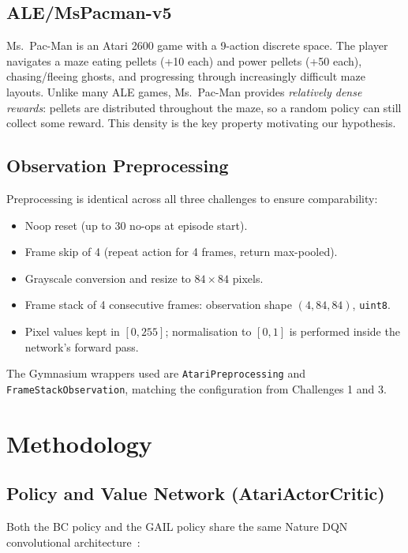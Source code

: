 \documentclass[conference]{IEEEtran}
\begin{document}
\subsection{ALE/MsPacman-v5}

Ms.\ Pac-Man is an Atari 2600 game with a 9-action discrete space.
The player navigates a maze eating pellets (+10 each) and power pellets (+50 each),
chasing/fleeing ghosts, and progressing through increasingly difficult maze layouts.
Unlike many ALE games, Ms.\ Pac-Man provides \emph{relatively dense rewards}: pellets
are distributed throughout the maze, so a random policy can still collect some reward.
This density is the key property motivating our hypothesis.

\subsection{Observation Preprocessing}

Preprocessing is identical across all three challenges to ensure comparability:
\begin{itemize}
  \item Noop reset (up to 30 no-ops at episode start).
  \item Frame skip of 4 (repeat action for 4 frames, return max-pooled).
  \item Grayscale conversion and resize to $84 \times 84$ pixels.
  \item Frame stack of 4 consecutive frames: observation shape $(4, 84, 84)$, \texttt{uint8}.
  \item Pixel values kept in $[0, 255]$; normalisation to $[0,1]$ is performed inside the
        network's forward pass.
\end{itemize}

The Gymnasium wrappers used are \texttt{AtariPreprocessing} and
\texttt{FrameStackObservation}, matching the configuration from Challenges 1 and 3.

\section{Methodology}
\label{sec:method}

\subsection{Policy and Value Network (AtariActorCritic)}

Both the BC policy and the GAIL policy share the same Nature DQN convolutional
architecture~\cite{mnih2015dqn}:
\end{document}
